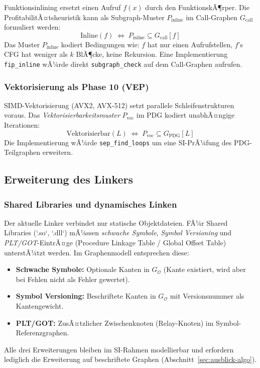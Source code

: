 ﻿\documentclass[a4paper,12pt]{article}
\theoremstyle{definition}
\begin{document}
Funktionsinlining ersetzt einen Aufruf $f(x)$ durch den FunktionskÃ¶rper.
Die ProfitabilitÃ¤tsheuristik kann als Subgraph-Muster $P_{\mathrm{inline}}$
im Call-Graphen $G_{\mathrm{call}}$ formuliert werden:
\[
\text{Inline}(f) \;\Leftrightarrow\; P_{\mathrm{inline}} \subseteq G_{\mathrm{call}}[f]
\]
Das Muster $P_{\mathrm{inline}}$ kodiert Bedingungen wie: $f$ hat
nur einen Aufrufstellen, $f$'s CFG hat weniger als $k$ BlÃ¶cke,
keine Rekursion. Eine Implementierung \texttt{fip\_inline} wÃ¼rde
direkt \texttt{subgraph\_check} auf dem Call-Graphen aufrufen.

\subsubsection{Vektorisierung als Phase 10 (VEP)}

SIMD-Vektorisierung (AVX2, AVX-512) setzt parallele Schleifenstrukturen
voraus. Das \emph{Vektorisierbarkeitsmuster} $P_{\mathrm{vec}}$ im PDG
kodiert unabhÃ¤ngige Iterationen:
\[
\text{Vektorisierbar}(L) \;\Leftrightarrow\; P_{\mathrm{vec}} \subseteq
G_{\mathrm{PDG}}[L]
\]
Die Implementierung wÃ¼rde \texttt{sep\_find\_loops} um eine
SI-PrÃ¼fung des PDG-Teilgraphen erweitern.

\subsection{Erweiterung des Linkers}
\label{sec:ausblick-linker}

\subsubsection{Shared Libraries und dynamisches Linken}

Der aktuelle Linker verbindet nur statische Objektdateien. FÃ¼r Shared
Libraries (`.so`, `.dll`) mÃ¼ssen \emph{schwache Symbole}, \emph{Symbol
	Versioning} und \emph{PLT/GOT}-EintrÃ¤ge (Procedure Linkage Table /
Global Offset Table) unterstÃ¼tzt werden. Im Graphenmodell entsprechen
diese:
\begin{itemize}
	\item \textbf{Schwache Symbole:} Optionale Kanten in $G_{\mathcal{O}}$
	(Kante existiert, wird aber bei Fehlen nicht als Fehler gewertet).
	\item \textbf{Symbol Versioning:} Beschriftete Kanten in
	$G_{\mathcal{O}}$ mit Versionsnummer als Kantengewicht.
	\item \textbf{PLT/GOT:} ZusÃ¤tzlicher Zwischenknoten (Relay-Knoten)
	im Symbol-Referenzgra\-phen.
\end{itemize}
Alle drei Erweiterungen bleiben im SI-Rahmen modellierbar und erfordern
lediglich die Erweiterung auf beschriftete Graphen
(Abschnitt~\ref{sec:ausblick-algo}).
\end{document}
